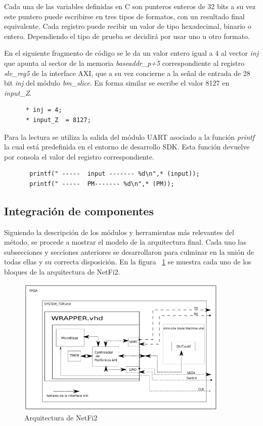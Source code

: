 \documentclass[a4paper,openright,12pt]{report}
\begin{document}
		Cada una de las variables definidas en C son punteros enteros de 32 bits a su vez este puntero puede escribirse en tres tipos de formatos, con un resultado final equivalente. Cada registro puede recibir un valor de tipo hexadecimal, binario o entero. Dependiendo el tipo de prueba se decidirá por usar uno u otro formato. 
        
        
        En el siguiente fragmento de código se le da un valor entero igual a 4  al vector \textit{inj} que apunta al sector de la memoria \textit{baseaddr\_p+5} correspondiente al registro \textit{slv\_reg5} de la interface AXI, que a su vez concierne a la señal de entrada de 28 bit \textit{inj} del módulo \textit{bm\_slice}. En forma similar se escribe el valor 8127 en \textit{input\_Z}.
      \begin{lstlisting}
      * inj = 4;
      * input_Z  = 8127;
     \end{lstlisting}
     Para la lectura se utiliza la salida del módulo UART asociado  a la función \textit{printf} la cual está predefinida en el entorno de desarrollo SDK. Esta función devuelve por consola el valor del registro correspondiente.      
      \begin{lstlisting}
       printf(" -----  input ------- %d\n",* (input));
       printf(" -----  PM------- %d\n",* (PM));
     \end{lstlisting}
     
     
    \subsection{Integración de componentes}
   
   Siguiendo la descripción de los módulos y herramientas más relevantes del método, se procede a mostrar el modelo de la arquitectura final. Cada uno las subsecciones y secciones anteriores se desarrollaron para culminar en la unión de todas ellas y su correcta disposición. En la  figura ~\ref{proceso2} se muestra cada uno de los bloques  de la arquitectura de NetFi2.
   
    
    \begin{figure}[H]
	\centering
	\includegraphics[width=0.9\textwidth]{img/Proceso2.pdf}
	\caption{Arquitectura  de  NetFi2 }
	\label{proceso2}
    \end{figure}
   
\end{document}
